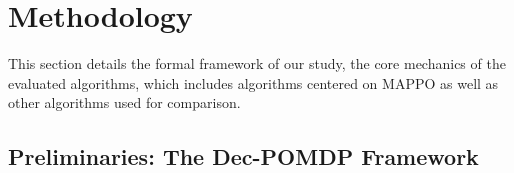 \section{Methodology}\label{sec:methods}

This section details the formal framework of our study, the core mechanics of the evaluated algorithms, which includes algorithms centered on MAPPO as well as other algorithms used for comparison.

\subsection{Preliminaries: The Dec-POMDP Framework}

